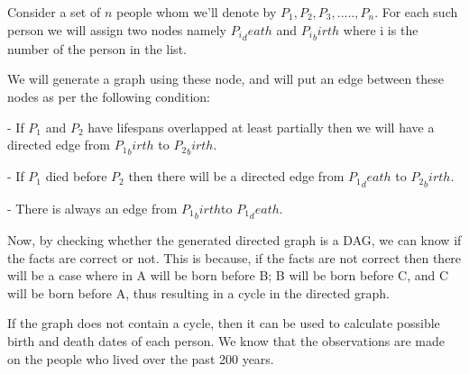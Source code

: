 \documentclass[letterpaper,portrait,12pt]{article}
\begin{document}
\begin{flushleft}

\end{flushleft}


\begin{flushleft}
Consider a set of $n$ people whom we'll denote by $P_1,P_2,P_3,.....,P_n$. For each such person we will assign two nodes namely ${P_i}_death$ and ${P_i}_birth$ where i is the number of the person in the list.
\end{flushleft}


\begin{flushleft}
We will generate a graph using these node, and will put an edge between these nodes as per the following condition:
\end{flushleft}


\begin{flushleft}
	- If $P_1 $ and $P_2$ have lifespans overlapped at least partially then we will have a directed edge from ${P_1}_birth $ to ${P_2}_birth$.
\end{flushleft}


\begin{flushleft}
	- If $P_1$ died before $P_2$ then there will be a directed edge from  ${P_1}_death$ to ${P_2}_birth$.
\end{flushleft}


\begin{flushleft}
	- There is always an edge from ${P_1}_birth$to ${P_1}_death$.
\end{flushleft}


\begin{flushleft}

\end{flushleft}


\begin{flushleft}
Now, by checking whether the generated directed graph is a DAG, we can know if the facts are correct or not. This is because, if the facts are not correct then there will be a case where in A will be born before B; B will be born before C, and C will be born before A, thus resulting in a cycle in the directed graph.
\end{flushleft}


\begin{flushleft}

\end{flushleft}


\begin{flushleft}
If the graph does not contain a cycle, then it can be used to calculate possible birth and death dates of each person. We know that the observations are made on the people who lived over the past 200 years.
\end{flushleft}
\end{document}
